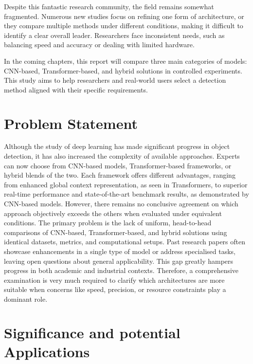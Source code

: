 Despite this fantastic research community, the field remains somewhat fragmented. Numerous new studies focus on refining one form of architecture, or they compare multiple methods under different conditions, making it difficult to identify a clear overall leader. Researchers face inconsistent needs, such as balancing speed and accuracy or dealing with limited hardware.

In the coming chapters, this report will compare three main categories of models: CNN-based, Transformer-based, and hybrid solutions in controlled experiments. This study aims to help researchers and real-world users select a detection method aligned with their specific requirements.

\section{Problem Statement}
Although the study of deep learning has made significant progress in object detection, it has also increased the complexity of available approaches. Experts can now choose from CNN-based models, Transformer-based frameworks, or hybrid blends of the two. Each framework offers different advantages, ranging from enhanced global context representation, as seen in Transformers, to superior real-time performance and state-of-the-art benchmark results, as demonstrated by CNN-based models. However, there remains no conclusive agreement on which approach objectively exceeds the others when evaluated under equivalent conditions.
The primary problem is the lack of uniform, head-to-head comparisons of CNN-based, Transformer-based, and hybrid solutions using identical datasets, metrics, and computational setups. Past research papers often showcase enhancements in a single type of model or address specialised tasks, leaving open questions about general applicability. This gap greatly hampers progress in both academic and industrial contexts. Therefore, a comprehensive examination is very much required to clarify which architectures are more suitable when concerns like speed, precision, or resource constraints play a dominant role.


\section{Significance and potential Applications}

